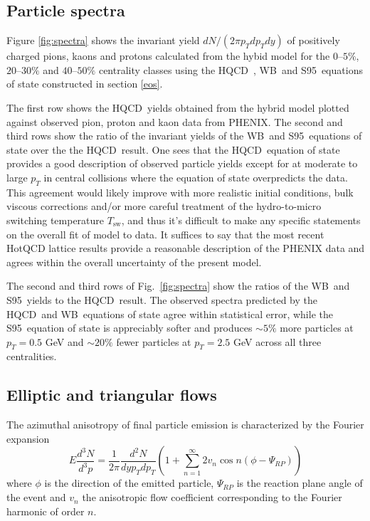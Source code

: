 \documentclass[aps,prc,reprint,amsmath,nofootinbib,superscriptaddress]{revtex4-1}
\newcommand{\hotqcd}{HQCD~}
\newcommand{\wb}{WB~}
\newcommand{\spv}{S95~}
\begin{document}
\subsection{Particle spectra}
\label{spectra}

Figure \ref{fig:spectra} shows the invariant yield $dN/(2\pi p_T dp_T dy)$ of positively charged pions, kaons and protons calculated from the hybid model for the $0$--$5\%$, $20$--$30\%$
and $40$--$50\%$ centrality classes using the \hotqcd, \wb and \spv equations of state constructed in section \ref{eos}. 

The first row shows the \hotqcd yields obtained from the hybrid model plotted against observed pion, proton and kaon data from PHENIX. The second and third rows show the ratio of the invariant yields of the \wb and \spv equations of state over the the \hotqcd result. One sees that the \hotqcd equation of state provides a good description of observed particle yields except for at moderate to large $p_T$ in central collisions where the equation of state overpredicts the data. This agreement would likely improve with more realistic initial conditions, bulk viscous corrections and/or more careful treatment of the hydro-to-micro switching temperature $T_\text{sw}$, and thus it's difficult to make any specific statements on the overall fit of model to data. It suffices to say that the most recent HotQCD lattice results provide a reasonable description of the PHENIX data and agrees within the overall uncertainty of the present model. 

The second and third rows of Fig.~\ref{fig:spectra} show the ratios of the \wb and \spv yields to the \hotqcd result. The observed spectra predicted by the \hotqcd and \wb equations of state agree within statistical error, while the \spv equation of state is appreciably softer and produces $\sim\!5\%$ more particles at $p_T = 0.5$ GeV and $\sim\!20\%$ fewer particles at $p_T=2.5$ GeV across all three centralities.

\subsection{Elliptic and triangular flows}
\label{flow}

The azimuthal anisotropy of final particle emission is characterized by the Fourier expansion
\begin{equation}
 E \frac{d^3N}{d^3p} = \frac{1}{2\pi} \frac{d^2N}{dy p_T dp_T} \left(1 + \sum\limits_{n=1}^\infty 2 v_n \cos n(\phi - \Psi_{RP}) \right)
\end{equation}
where $\phi$ is the direction of the emitted particle, $\Psi_{RP}$ is the reaction plane angle of the event and $v_n$ the anisotropic flow coefficient corresponding to the Fourier harmonic of order $n$.
\end{document}
